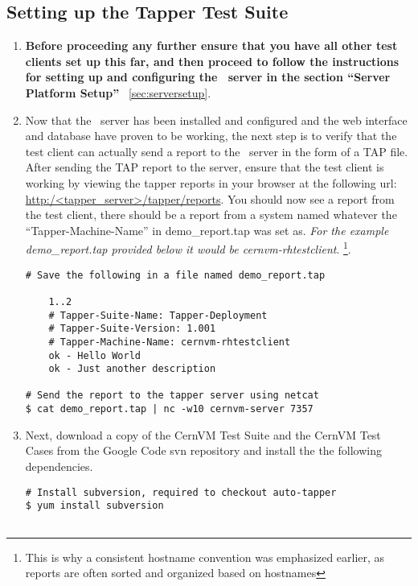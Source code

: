 \subsection{Setting up the Tapper Test Suite}
\label{sec:rhtestsuite}
\begin{enumerate}
\item 	{\bf Before proceeding any further ensure that you have all other test clients set up this far, and then proceed
		to follow the instructions for setting up and configuring the \tapper~server in the section ``Server Platform Setup''}		
		~\ref{sec:serversetup}.
		
\item 	Now that the \tapper~server has been installed and configured and the \tapper web interface and database have proven
		to be working, the next step is to verify that the test client can actually send a report to the \tapper~server in
		the form of a TAP file. After sending the TAP report to the server, ensure that the test client is working by viewing 
		the tapper reports in your browser at the following url: \url{http:/<tapper\_server>/tapper/reports}. You should now see a 
		report from the test client, there should be a report from a system named whatever the ``Tapper-Machine-Name'' in 
		demo\_report.tap was set as. \emph{For the example demo\_report.tap provided below it would be cernvm-rhtestclient}.
		\footnote{This is why a consistent hostname convention was emphasized earlier, as reports are often sorted and organized 
		based on hostnames}.
		
\lstset{language=bash,caption=Send a Basic Report to the \tapper~Server}
\begin{lstlisting}
# Save the following in a file named demo_report.tap

	1..2
	# Tapper-Suite-Name: Tapper-Deployment
	# Tapper-Suite-Version: 1.001
	# Tapper-Machine-Name: cernvm-rhtestclient
	ok - Hello World
	ok - Just another description

# Send the report to the tapper server using netcat
$ cat demo_report.tap | nc -w10 cernvm-server 7357
\end{lstlisting}

\item 	Next, download a copy of the CernVM Test Suite and the CernVM Test Cases from the Google Code svn repository
		\cite{GCreleasetesting} and install the the following dependencies.
		
\lstset{language=bash,caption=Install CernVM Test Suite and Dependencies}
\begin{lstlisting}
# Install subversion, required to checkout auto-tapper
$ yum install subversion


\end{lstlisting}
\end{enumerate}
